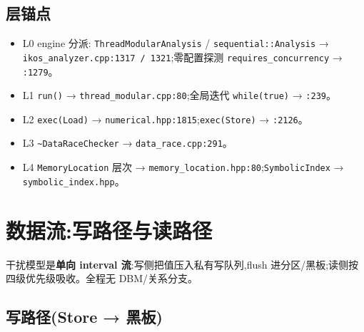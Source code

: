 \documentclass[11pt]{ctexart}
\newcommand{\code}[1]{\texttt{#1}}
\begin{document}
\subsection*{层锚点}
\begin{itemize}[leftmargin=2em]
  \item L0 engine 分派: \code{ThreadModularAnalysis} / \code{sequential::Analysis}
        → \code{ikos\_analyzer.cpp:1317 / 1321};零配置探测 \code{requires\_concurrency} → \code{:1279}。
  \item L1 \code{run()} → \code{thread\_modular.cpp:80};全局迭代 \code{while(true)} → \code{:239}。
  \item L2 \code{exec(Load)} → \code{numerical.hpp:1815};\code{exec(Store)} → \code{:2126}。
  \item L3 \code{\textasciitilde DataRaceChecker} → \code{data\_race.cpp:291}。
  \item L4 \code{MemoryLocation} 层次 → \code{memory\_location.hpp:80};\code{SymbolicIndex} → \code{symbolic\_index.hpp}。
\end{itemize}

\section{数据流:写路径与读路径}
\label{sec:dataflow}

干扰模型是\textbf{单向 interval 流}:写侧把值压入私有写队列,flush 进分区/黑板;读侧按
四级优先级吸收。全程无 DBM/关系分支。

\subsection{写路径(Store → 黑板)}
\end{document}

